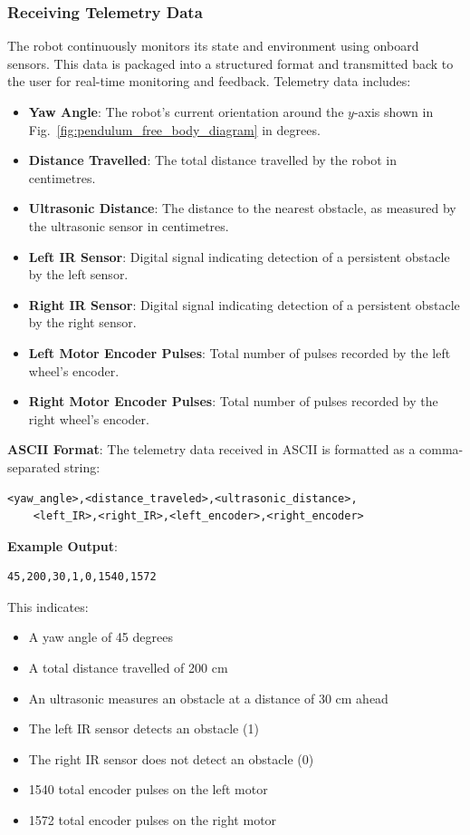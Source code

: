 \subsubsection{Receiving Telemetry Data}
The robot continuously monitors its state and environment using onboard sensors. This data is packaged into a structured format and transmitted back to the user for real-time monitoring and feedback. Telemetry data includes:
\begin{itemize}
	\item \textbf{Yaw Angle}: The robot's current orientation around the $y$-axis shown in Fig.~\ref{fig:pendulum_free_body_diagram} in degrees.
	\item \textbf{Distance Travelled}: The total distance travelled by the robot in centimetres.
	\item \textbf{Ultrasonic Distance}: The distance to the nearest obstacle, as measured by the ultrasonic sensor in centimetres.
	\item \textbf{Left IR Sensor}: Digital signal indicating detection of a persistent obstacle by the left sensor.
	\item \textbf{Right IR Sensor}: Digital signal indicating detection of a persistent obstacle by the right sensor.
	\item \textbf{Left Motor Encoder Pulses}: Total number of pulses recorded by the left wheel's encoder.
	\item \textbf{Right Motor Encoder Pulses}: Total number of pulses recorded by the right wheel's encoder.
\end{itemize}

\textbf{ASCII Format}:
The telemetry data received in ASCII is formatted as a comma-separated string:
\begin{lstlisting}[]
	<yaw_angle>,<distance_traveled>,<ultrasonic_distance>,
	<left_IR>,<right_IR>,<left_encoder>,<right_encoder>
\end{lstlisting}

\textbf{Example Output}:
\begin{lstlisting}[]
	45,200,30,1,0,1540,1572
\end{lstlisting}

This indicates:
\begin{itemize}
	\item A yaw angle of 45 degrees
	\item A total distance travelled of 200 cm
	\item An ultrasonic measures an obstacle at a distance of 30 cm ahead
	\item The left IR sensor detects an obstacle (1)
	\item The right IR sensor does not detect an obstacle (0)
	\item 1540 total encoder pulses on the left motor
	\item 1572 total encoder pulses on the right motor
\end{itemize}

